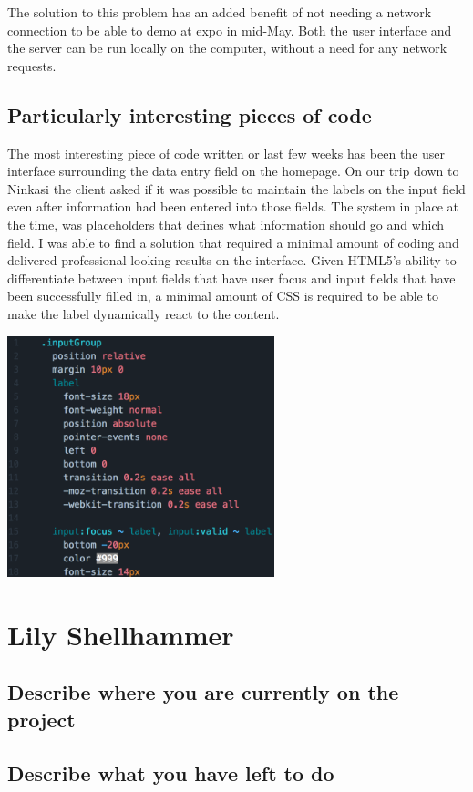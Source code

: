 \documentclass[draftclsnofoot,onecolumn,letterpaper,10pt,compsoc]{IEEEtran}
\begin{document}
The solution to this problem has an added benefit of not needing a network connection to be able to demo at expo in mid-May.
Both the user interface and the server can be run locally on the computer, without a need for any network requests.


\subsection{Particularly interesting pieces of code}

The most interesting piece of code written or last few weeks has been the user interface surrounding the data entry field on the homepage.
On our trip down to Ninkasi the client asked if it was possible to maintain the labels on the input field even after information had been entered into those fields.
The system in place at the time, was placeholders that defines what information should go and which field.
I was able to find a solution that required a minimal amount of coding and delivered professional looking results on the interface.
Given HTML5’s ability to differentiate between input fields that have user focus and input fields that have been successfully filled in, a minimal amount of CSS is required to be able to make the label dynamically react to the content.

\centerline{\includegraphics[height=7cm]{screenshots/inputLabel.png}}



\section{Lily Shellhammer}
\subsection{Describe where you are currently on the project}
\subsection{Describe what you have left to do}
\end{document}

